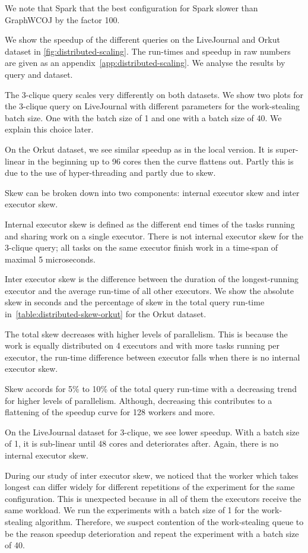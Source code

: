 We note that Spark that the best configuration for Spark slower than GraphWCOJ by the factor 100.

We show the speedup of the different queries on the LiveJournal and Orkut dataset in \cref{fig:distributed-scaling}.
The run-times and speedup in raw numbers are given as an appendix~\cref{app:distributed-scaling}.
We analyse the results by query and dataset.

The 3-clique query scales very differently on both datasets.
We show two plots for the 3-clique query on LiveJournal with different parameters for the work-stealing
batch size.
One with the batch size of 1 and one with a batch size of 40.
We explain this choice later.

On the Orkut dataset, we see similar speedup as in the local version.
It is super-linear in the beginning up to 96 cores then the curve flattens out.
Partly this is due to the use of hyper-threading and partly due to skew.

Skew can be broken down into two components: internal executor skew and inter executor skew.

Internal executor skew is defined as the different end times of the tasks running and sharing work on
a single executor.
There is not internal executor skew for the 3-clique query;
all tasks on the same executor finish work in a time-span of maximal 5 microseconds.

Inter executor skew is the difference between the duration of the longest-running executor and the average
run-time of all other executors.
We show the absolute skew in seconds and the percentage of skew in the total query run-time
in~\cref{table:distributed-skew-orkut} for the Orkut dataset.

The total skew decreases with higher levels of parallelism.
This is because the work is equally distributed on 4 executors and with more tasks running per executor,
the run-time difference between executor falls when there is no internal executor skew.

Skew accords for 5\% to 10\% of the total query run-time with a decreasing trend for higher levels of
parallelism.
Although, decreasing this contributes to a flattening of the speedup curve for 128 workers and more.

On the LiveJournal dataset for 3-clique, we see lower speedup.
With a batch size of 1, it is sub-linear until 48 cores and deteriorates after.
Again, there is no internal executor skew.

During our study of inter executor skew, we noticed that the worker which takes longest can differ widely
for different repetitions of the experiment for the same configuration.
This is unexpected because in all of them the executors receive the same workload.
We run the experiments with a batch size of 1 for the work-stealing algorithm.
Therefore, we suspect contention of the work-stealing queue to be the reason speedup deterioration and
repeat the experiment with a batch size of 40.

